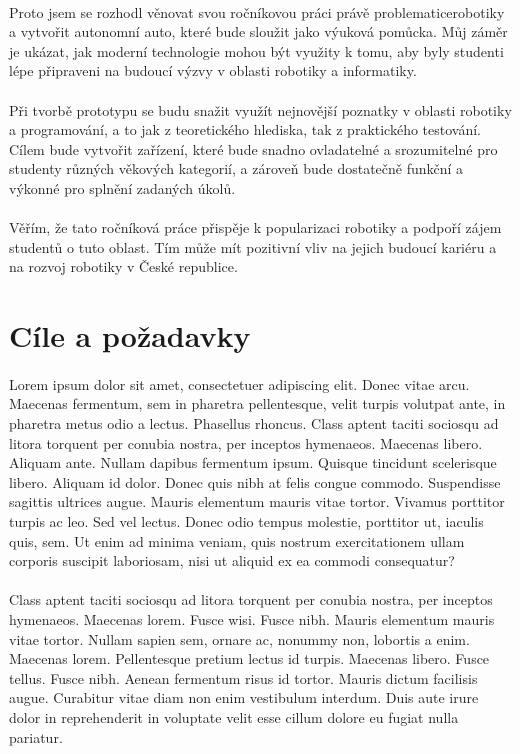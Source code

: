 \documentclass[12pt, a4paper]{article}
\begin{document}
	\paragraph{} Proto jsem se rozhodl věnovat svou ročníkovou práci právě problematicerobotiky a vytvořit autonomní auto, které bude sloužit jako výuková pomůcka. Můj záměr je ukázat, jak moderní technologie mohou být využity k tomu, aby byly studenti lépe připraveni na budoucí výzvy v oblasti robotiky a informatiky.
	\paragraph{} Při tvorbě prototypu se budu snažit využít nejnovější poznatky v oblasti robotiky a programování, a to jak z teoretického hlediska, tak z praktického testování. Cílem bude vytvořit zařízení, které bude snadno ovladatelné a srozumitelné pro studenty různých věkových kategorií, a zároveň bude dostatečně funkční a výkonné pro splnění zadaných úkolů.
	\paragraph{} Věřím, že tato ročníková práce přispěje k popularizaci robotiky a podpoří zájem studentů o tuto oblast. Tím může mít pozitivní vliv na jejich budoucí kariéru a na rozvoj robotiky v České republice.
	
	\newpage
	\section{Cíle a požadavky}
	\paragraph{} Lorem ipsum dolor sit amet, consectetuer adipiscing elit. Donec vitae arcu. Maecenas fermentum, sem in pharetra pellentesque, velit turpis volutpat ante, in pharetra metus odio a lectus. Phasellus rhoncus. Class aptent taciti sociosqu ad litora torquent per conubia nostra, per inceptos hymenaeos. Maecenas libero. Aliquam ante. Nullam dapibus fermentum ipsum. Quisque tincidunt scelerisque libero. Aliquam id dolor. Donec quis nibh at felis congue commodo. Suspendisse sagittis ultrices augue. Mauris elementum mauris vitae tortor. Vivamus porttitor turpis ac leo. Sed vel lectus. Donec odio tempus molestie, porttitor ut, iaculis quis, sem. Ut enim ad minima veniam, quis nostrum exercitationem ullam corporis suscipit laboriosam, nisi ut aliquid ex ea commodi consequatur?
	\paragraph{} Class aptent taciti sociosqu ad litora torquent per conubia nostra, per inceptos hymenaeos. Maecenas lorem. Fusce wisi. Fusce nibh. Mauris elementum mauris vitae tortor. Nullam sapien sem, ornare ac, nonummy non, lobortis a enim. Maecenas lorem. Pellentesque pretium lectus id turpis. Maecenas libero. Fusce tellus. Fusce nibh. Aenean fermentum risus id tortor. Mauris dictum facilisis augue. Curabitur vitae diam non enim vestibulum interdum. Duis aute irure dolor in reprehenderit in voluptate velit esse cillum dolore eu fugiat nulla pariatur.
\end{document}

